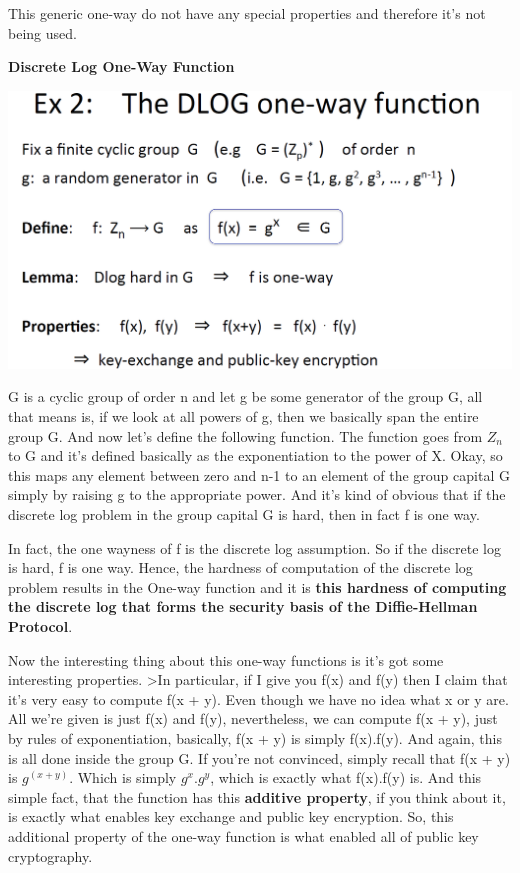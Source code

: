 \documentclass[11pt]{article}
\makeatletter
\def\maxwidth{\ifdim\Gin@nat@width>\linewidth\linewidth
    \else\Gin@nat@width\fi}
\let\Oldincludegraphics\includegraphics
\renewcommand{\includegraphics}[1]{\Oldincludegraphics[width=.8\maxwidth]{#1}}
\makeatother
\begin{document}
This generic one-way do not have any special properties and therefore
it's not being used.

\textbf{Discrete Log One-Way Function}

\includegraphics{./Images/DLog1WayFxn.png}

G is a cyclic group of order n and let g be some generator of the group
G, all that means is, if we look at all powers of g, then we basically
span the entire group G. And now let's define the following function.
The function goes from \(Z_n\) to G and it's defined basically as the
exponentiation to the power of X. Okay, so this maps any element between
zero and n-1 to an element of the group capital G simply by raising g to
the appropriate power. And it's kind of obvious that if the discrete log
problem in the group capital G is hard, then in fact f is one way.

In fact, the one wayness of f is the discrete log assumption. So if the
discrete log is hard, f is one way. Hence, the hardness of computation
of the discrete log problem results in the One-way function and it is
\textbf{this hardness of computing the discrete log that forms the
security basis of the Diffie-Hellman Protocol}.

Now the interesting thing about this one-way functions is it's got some
interesting properties. \textgreater{}In particular, if I give you f(x)
and f(y) then I claim that it's very easy to compute f(x + y). Even
though we have no idea what x or y are. All we're given is just f(x) and
f(y), nevertheless, we can compute f(x + y), just by rules of
exponentiation, basically, f(x + y) is simply f(x).f(y). And again, this
is all done inside the group G. If you're not convinced, simply recall
that f(x + y) is \(g^{(x + y)}\). Which is simply \(g^x\).\(g^y\), which
is exactly what f(x).f(y) is. And this simple fact, that the function
has this \textbf{additive property}, if you think about it, is exactly
what enables key exchange and public key encryption. So, this additional
property of the one-way function is what enabled all of public key
cryptography.
\end{document}
